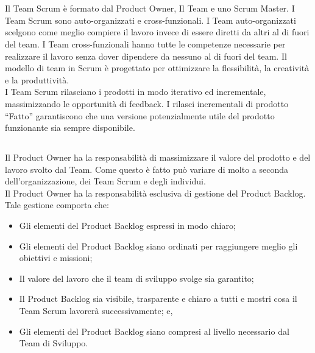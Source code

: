 
\section*{\color{Blue}{Scrum Team}}%
\label{sec:team}
Il Team Scrum \`e formato dal Product Owner, Il Team e uno Scrum Master. I Team  Scrum sono auto-organizzati e cross-funzionali. I Team 
auto-organizzati scelgono come meglio compiere il lavoro invece di essere diretti da altri al di fuori del team. I Team 
cross-funzionali hanno tutte le competenze necessarie per realizzare il lavoro senza dover dipendere da nessuno al di fuori del team. Il 
modello di team in Scrum \`e progettato per ottimizzare la flessibilità, la creativit\`a e la produttivit\`a.
\newline
\\I Team Scrum rilasciano i prodotti in modo iterativo ed incrementale, massimizzando le opportunit\`a di feedback. I rilasci incrementali 
di prodotto ``Fatto'' garantiscono che una versione potenzialmente utile del prodotto funzionante sia sempre disponibile.

\subsection*{\color{SteelBlue}{Il Product Owner}}%
\label{sec:productowner}
Il Product Owner ha la responsabilit\`a  di massimizzare il valore del prodotto e del lavoro svolto dal Team. Come questo \`e fatto pu\`o 
variare di molto a seconda dell'organizzazione, dei Team Scrum e degli individui. \newline 
\\Il Product Owner ha la responsabilit\`a esclusiva di gestione del Product Backlog. Tale gestione comporta che:

\begin{itemize}
	\item Gli elementi del Product Backlog espressi in modo chiaro;
	\item Gli elementi del Product Backlog siano ordinati per raggiungere meglio gli obiettivi e missioni;
	\item Il valore del lavoro che il team di sviluppo svolge sia garantito;
	\item Il Product Backlog sia visibile, trasparente e chiaro a tutti e mostri cosa il Team Scrum lavorerà 
	successivamente; e,
	\item Gli elementi del Product Backlog siano compresi al livello necessario dal Team di Sviluppo.
\end{itemize}

